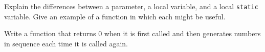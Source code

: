 %
%
\begin{question}
Explain the differences between a parameter, a local variable,
and a local \verb|static| variable. Give an example of a function in which each
might be useful.
\end{question}

\begin{question}
Write a function that returns 0 when it is first called and then
generates numbers in sequence each time it is called again.
\end{question}
